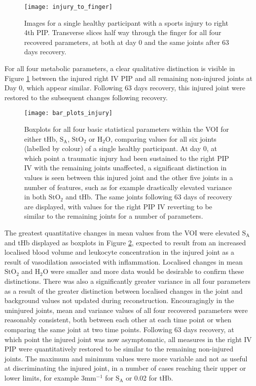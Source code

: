 \documentclass[twoside]{bhamthesis}
\theoremstyle{definition}
\begin{document}
\begin{figure}[!ht]
\centering\texttt{[image: injury\_to\_finger]}
\caption{Images for a single healthy participant with a sports injury to right 4th PIP. Transverse slices half way through the finger for all four recovered parameters, at both at day 0 and the same joints after 63 days recovery.}
\label{fig:injury_to_finger}
\end{figure}

For all four metabolic parameters, a clear qualitative distinction is visible in Figure \ref{fig:injury_to_finger} between the injured right IV PIP and all remaining non-injured joints at Day 0, which appear similar. Following 63 days recovery, this injured joint were restored to the subsequent changes following recovery.
 
\begin{figure}[!ht]
\centering\texttt{[image: bar\_plots\_injury]}
\caption{Boxplots for all four basic statistical parameters within the VOI for either tHb, $\mathrm{S_A}$, $\mathrm{StO_2}$ or $\mathrm{H_2O}$, comparing values for all six joints (labelled by colour) of a single healthy participant. At day 0, at which point a traumatic injury had been sustained to the right PIP IV with the remaining joints unaffected, a significant distinction in values is seen between this injured joint and the other five joints in a number of features, such as for example drastically elevated variance in both $\mathrm{StO_2}$ and tHb. The same joints following 63 days of recovery are displayed, with values for the right PIP IV reverting to be similar to the remaining joints for a number of parameters.}
\label{fig:bar_plots_injury}
\end{figure}

The greatest quantitative changes in mean values from the VOI were elevated $\mathrm{S_A}$ and tHb displayed as boxplots in Figure \ref{fig:bar_plots_injury}, expected to result from an increased localised blood volume and leukocyte concentration in the injured joint as a result of vasodilation associated with inflammation. Localised changes in mean $\mathrm{StO_2}$ and $\mathrm{H_2O}$ were smaller and more data would be desirable to confirm these distinctions. There was also a significantly greater variance in all four parameters as a result of the greater distinction between localised changes in the joint and background values not updated during reconstruction. Encouragingly in the uninjured joints, mean and variance values of all four recovered parameters were reasonably consistent, both between each other at each time point or when comparing the same joint at two time points. Following 63 days recovery, at which point the injured joint was now asymptomatic, all measures in the right IV PIP were quantitatively restored to be similar to the remaining non-injured joints. The maximum and minimum values were more variable and not as useful at discriminating the injured joint, in a number of cases reaching their upper or lower limits, for example 3mm$^{-1}$ for $\mathrm{S_A}$ or 0.02 for tHb.
 
\end{document}
